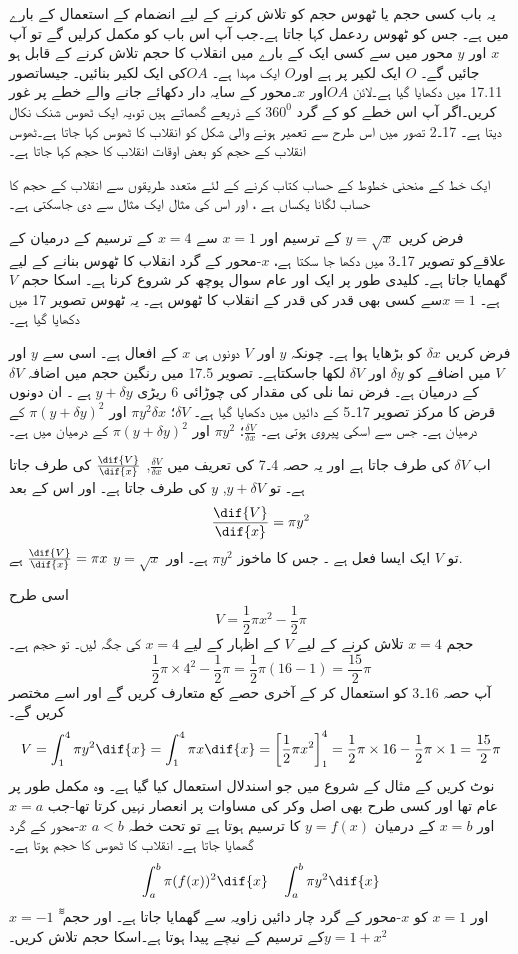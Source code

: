
 یہ باب کسی حجم یا ٹھوس حجم کو تلاش کرنے کے لیے انضمام کے استعمال کے بارے میں ہے۔ جس کو ٹھوس ردعمل کہا جاتا ہے۔جب آپ اس باب کو مکمل کرلیں گے تو آپ \(x\) اور \(y\) محور میں سے کسی ایک کے بارے میں انقلاب کا حجم تلاش کرنے کے قابل ہو جائیں گے۔
 \(O\) ایک لکیر پر ہے اور\(O\) ایک مہدا ہے۔
\(OA\)کی ایک لکیر بنائیں۔
جیساتصور 17.11 میں دکھایا گیا ہے۔لائن \(OA\)اور \(x\)۔محور کے سایہ دار دکھائے جانے والے خطے پر غور کریں۔اگر آپ اس خطے کو کے گرد \(360^0\) کے ذریعے گھماتے ہیں تو،یہ ایک ٹھوس شنک نکال دیتا ہے۔ 17۔2 تصور میں اس طرح سے تعمیر ہونے والی شکل کو انقلاب کا ٹھوس کہا جاتا ہے۔ٹھوس انقلاب کے حجم کو بعض اوقات انقلاب کا حجم کہا جاتا ہے۔

ایک خط کے منحنی خطوط کے حساب کتاب کرنے کے لئے متعدد طریقوں سے انقلاب کے حجم کا حساب لگانا یکساں ہے ، اور اس کی مثال ایک مثال سے دی جاسکتی ہے۔

فرض کریں \(y=\sqrt{x}\) کے ترسیم اور \(x=1\) سے \(x=4\) کے ترسیم کے درمیان کے علاقےکو تصویر 17۔3 میں دکھا جا سکتا ہے، \(x\)-محور کے گرد انقلاب کا ٹھوس بنانے کے لیے گھمایا جاتا ہے۔%
کلیدی طور پر ایک اور عام سوال پوچھ کر شروع کرنا ہے۔ اسکا حجم \(V\) ہے۔ \(x=1\)سے کسی بھی قدر کی قدر کے انقلاب کا ٹھوس ہے۔ یہ ٹھوس تصویر 17 میں دکھایا گیا ہے۔

فرض کریں \(\delta{x}\) کو بڑھایا ہوا ہے۔ چونکہ \(y\) اور \(V\) دونوں ہی \(x\) کے افعال ہے۔ اسی سے \(y\)  اور \(V\)  میں اضافے کو  \(\delta{y}\) اور \(\delta{V}\) لکھا جاسکتاہے۔ تصویر 17.5 میں رنگین حجم  میں اضافہ \(\delta{V}\)کے درمیان ہے۔ فرض نما نلی کی مقدار کی چوڑائی 6 ریڑی \(y+\delta{y}\) ہے ۔ ان دونوں قرض کا مرکز  تصویر 17۔5 کے دائیں میں دکھایا گیا ہے۔ \(\delta{V}\)؛  \(\pi y^{2}\delta{x}\) اور \(\pi(y+\delta{y})^{2}\) کے درمیان ہے۔ جس سے اسکی پیروی ہوتی ہے۔ \(\frac{\delta{V}}{\delta{x}}\)؛ \(\pi y^{2}\) اور \(\pi(y+\delta{y})^{2}\) کے درمیان میں ہے۔

اب \(\delta{V}\)  کی طرف جاتا ہے اور یہ حصہ 4۔7 کی تعریف میں \(\frac{\delta{V}}{\delta{x}}\), \(\frac{\dif{V}}{\dif{x}}\)  کی طرف جاتا ہے۔ تو \(y+\delta{V}\), \(y\) کی طرف جاتا ہے۔ اور اس کے بعد 
\[\frac{\dif{V}}{\dif{x}}=\pi y^{2}\]
تو  \(V\) ایک ایسا فعل ہے ۔ جس کا ماخوز \(\pi y^{2}\) ہے۔ اور \(y=\sqrt{x}\)
 \(\frac{\dif{V}}{\dif{x}}=\pi x\) ہے.

اسی طرح
\[V=\frac{1}{2}\pi x^{2} - \frac{1}{2}\pi\]
حجم \(x=4\) تلاش کرنے کے لیے \(V\) کے اظہار کے لیے \(x=4\) کی جگہ لیں۔ تو حجم ہے۔
\[\frac{1}{2}\pi\times4^{2}-\frac{1}{2}\pi = \frac{1}{2}\pi(16-1)=\frac{15}{2}\pi\]
آپ حصہ 16۔3 کو استعمال کر کے آخری حصے کع متعارف کریں گے اور اسے مختصر کریں گے۔
\[V=\int_{1}^{4}\pi y^{2}\dif{x}=\int_{1}^{4}\pi x\dif{x} =\left[\frac{1}{2}\pi x^{2}\right]_{1}^{4}=\frac{1}{2}\pi\times16-\frac{1}{2}\pi\times1=\frac{15}{2}\pi\]
نوٹ کریں کے مثال کے شروع میں جو اسندلال استعمال کیا گیا ہے۔ وہ مکمل طور پر عام تھا اور کسی طرح بھی  اصل وکر کی مساوات پر انعصار نہیں کرتا تھا-جب  \( x=a\) اور \(x=b\) کے درمیان \(y=f(x)\) کا ترسیم ہوتا ہے تو تحت خطہ \(a<b\) \(x\)-محور  کے گرد گھمایا جاتا ہے۔ انقلاب کا ٹھوس کا حجم ہوتا ہے۔
\[\int_{a}^{b}\pi(f(x))^2\dif{x}\quad\int_{a}^{b}\pi y^{2}\dif{x}\]
\(x=-1\) اور \( x=1\) کو \(x\)-محور کے گرد چار دائیں زاویہ سے گھمایا  جاتا ہے۔ اور حجم ٓٓٓ\(y=1+x^{2}\)کے ترسیم کے نیچے پیدا ہوتا ہے۔اسکا حجم تلاش کریں۔

